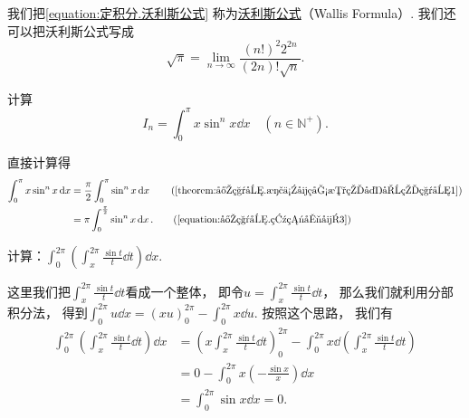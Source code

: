 我们把\cref{equation:定积分.沃利斯公式}
称为\hyperref[equation:定积分.沃利斯公式]{沃利斯公式}（Wallis Formula）.
我们还可以把沃利斯公式写成\begin{equation}
	\sqrt\pi
	= \lim_{n\to\infty} \frac{(n!)^2 2^{2n}}{(2n)! \sqrt{n}}.
\end{equation}

\begin{example}
计算\[
	I_n = \int_0^\pi x \sin^n x \dd{x}
	\quad(n\in\mathbb{N}^+).
\]
\begin{solution}
直接计算得\begin{align*}
	\int_0^\pi x \sin^n x \dd{x}
	&= \frac\pi2 \int_0^\pi \sin^n x \dd{x}
		\tag{\cref{theorem:定积分.正余弦函数的复合的积分1}} \\
	&= \pi \int_0^{\frac\pi2} \sin^n x \dd{x}.
		\tag{\cref{equation:定积分.点火公式3}}
\end{align*}
\end{solution}
\end{example}

\begin{example}
计算：\(\int_0^{2\pi}\left(\int_x^{2\pi}\frac{\sin t}{t}\dd{t}\right)\dd{x}\).
\begin{solution}
这里我们把\(\int_x^{2\pi}\frac{\sin t}{t}\dd{t}\)看成一个整体，
即令\(u = \int_x^{2\pi}\frac{\sin t}{t}\dd{t}\)，
那么我们就利用分部积分法，
得到\(\int_0^{2\pi} u \dd{x} = (x u)_0^{2\pi} - \int_0^{2\pi} x \dd{u}\).
按照这个思路，
我们有\begin{align*}
	\int_0^{2\pi}\left(\int_x^{2\pi}\frac{\sin t}{t}\dd{t}\right)\dd{x}
	&= \left(x \int_x^{2\pi}\frac{\sin t}{t}\dd{t}\right)_0^{2\pi}
	- \int_0^{2\pi} x \dd(\int_x^{2\pi}\frac{\sin t}{t}\dd{t}) \\
	&= 0 - \int_0^{2\pi} x \left(-\frac{\sin x}{x}\right) \dd{x} \\
	&= \int_0^{2\pi} \sin x \dd{x} = 0.
\end{align*}
\end{solution}
\end{example}
